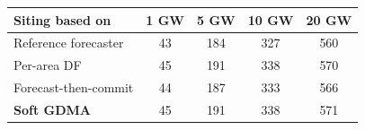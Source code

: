 \begin{tabular}{@{}lcccc@{}}
\toprule
Siting based on & 1 GW & 5 GW & 10 GW & 20 GW \\
\midrule
Reference forecaster & 43 & 184 & 327 & 560 \\
Per-area DF & 45 & 191 & 338 & 570 \\
Forecast-then-commit & 44 & 187 & 333 & 566 \\
\textbf{Soft GDMA} & 45 & 191 & 338 & 571 \\
\bottomrule
\end{tabular}